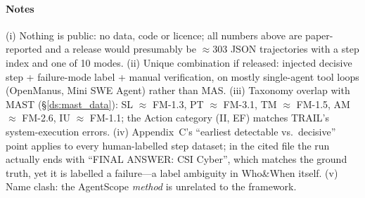\paragraph{Notes} (i) Nothing is public: no data, code or licence; all numbers above are paper-reported and a release would presumably be $\approx$303 JSON trajectories with a step index and one of 10 modes. (ii) Unique combination if released: injected decisive step + failure-mode label + manual verification, on mostly single-agent tool loops (OpenManus, Mini SWE Agent) rather than MAS. (iii) Taxonomy overlap with MAST (\S\ref{ds:mast_data}): SL $\approx$ FM-1.3, PT $\approx$ FM-3.1, TM $\approx$ FM-1.5, AM $\approx$ FM-2.6, IU $\approx$ FM-1.1; the Action category (II, EF) matches TRAIL's system-execution errors. (iv) Appendix~C's ``earliest detectable vs.\ decisive'' point applies to every human-labelled step dataset; in the cited file the run actually ends with ``FINAL ANSWER: CSI Cyber'', which matches the ground truth, yet it is labelled a failure---a label ambiguity in Who\&When itself. (v) Name clash: the AgentScope \emph{method} is unrelated to the  framework.
